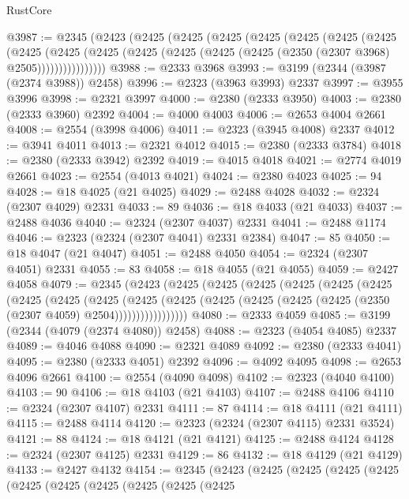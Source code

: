 \begin{lexlean}{RustCore}
\begin{coremodule}
@3987 := @2345
    (@2423
      (@2425
        (@2425
          (@2425
            (@2425
              (@2425
                (@2425
                  (@2425
                    (@2425
                      (@2425
                        (@2425
                          (@2425 (@2425 (@2425 (@2425 (@2350 (@2307 @3968) @2505))))))))))))))))
@3988 := @2333 @3968
@3993 := @3199 (@2344 (@3987 (@2374 @3988)) @2458)
@3996 := @2323 (@3963 @3993) @2337
@3997 := @3955 @3996
@3998 := @2321 @3997
@4000 := @2380 (@2333 @3950)
@4003 := @2380 (@2333 @3960) @2392
@4004 := @4000 @4003
@4006 := @2653 @4004 @2661
@4008 := @2554 (@3998 @4006)
@4011 := @2323 (@3945 @4008) @2337
@4012 := @3941 @4011
@4013 := @2321 @4012
@4015 := @2380 (@2333 @3784)
@4018 := @2380 (@2333 @3942) @2392
@4019 := @4015 @4018
@4021 := @2774 @4019 @2661
@4023 := @2554 (@4013 @4021)
@4024 := @2380 @4023
@4025 := 94
@4028 := @18 @4025 (@21 @4025)
@4029 := @2488 @4028
@4032 := @2324 (@2307 @4029) @2331
@4033 := 89
@4036 := @18 @4033 (@21 @4033)
@4037 := @2488 @4036
@4040 := @2324 (@2307 @4037) @2331
@4041 := @2488 @1174
@4046 := @2323 (@2324 (@2307 @4041) @2331 @2384)
@4047 := 85
@4050 := @18 @4047 (@21 @4047)
@4051 := @2488 @4050
@4054 := @2324 (@2307 @4051) @2331
@4055 := 83
@4058 := @18 @4055 (@21 @4055)
@4059 := @2427 @4058
@4079 := @2345
    (@2423
      (@2425
        (@2425
          (@2425
            (@2425
              (@2425
                (@2425
                  (@2425
                    (@2425
                      (@2425
                        (@2425
                          (@2425
                            (@2425 (@2425 (@2425 (@2425 (@2350 (@2307 @4059) @2504)))))))))))))))))
@4080 := @2333 @4059
@4085 := @3199 (@2344 (@4079 (@2374 @4080)) @2458)
@4088 := @2323 (@4054 @4085) @2337
@4089 := @4046 @4088
@4090 := @2321 @4089
@4092 := @2380 (@2333 @4041)
@4095 := @2380 (@2333 @4051) @2392
@4096 := @4092 @4095
@4098 := @2653 @4096 @2661
@4100 := @2554 (@4090 @4098)
@4102 := @2323 (@4040 @4100)
@4103 := 90
@4106 := @18 @4103 (@21 @4103)
@4107 := @2488 @4106
@4110 := @2324 (@2307 @4107) @2331
@4111 := 87
@4114 := @18 @4111 (@21 @4111)
@4115 := @2488 @4114
@4120 := @2323 (@2324 (@2307 @4115) @2331 @3524)
@4121 := 88
@4124 := @18 @4121 (@21 @4121)
@4125 := @2488 @4124
@4128 := @2324 (@2307 @4125) @2331
@4129 := 86
@4132 := @18 @4129 (@21 @4129)
@4133 := @2427 @4132
@4154 := @2345
    (@2423
      (@2425
        (@2425
          (@2425
            (@2425
              (@2425
                (@2425
                  (@2425
                    (@2425
                      (@2425
                        (@2425

\end{coremodule}
\end{lexlean}
